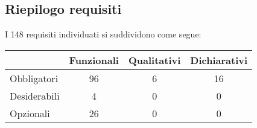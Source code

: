 \subsection{Riepilogo requisiti}

I 148 requisiti individuati si suddividono come segue:
\begin{center}
  \centering
  \begin{tabular}{|l|c|c|c|}
    \hline
      & Funzionali & Qualitativi & Dichiarativi   \\
\hline
Obbligatori &      96     &    6     & 16       \\
\hline
Desiderabili &     4     &     0     & 0    \\
\hline
Opzionali   &      26     &    0     & 0    \\
\hline
  \end{tabular}
\end{center}

